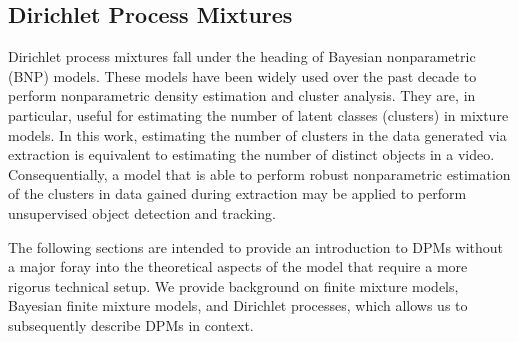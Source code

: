 \documentclass[smallcondensed, final]{svjour3}
\begin{document}






\subsection{Dirichlet Process Mixtures}
\label{sec:dpm}

Dirichlet process mixtures fall under the heading of Bayesian nonparametric (BNP) models. These models have been widely used over the past decade to perform nonparametric density estimation and cluster analysis. They are, in particular, useful for estimating the number of latent classes (clusters) in mixture models. In this work, estimating the number of clusters in the data generated via extraction is equivalent to estimating the number of distinct objects in a video. Consequentially, a model that is able to perform robust nonparametric estimation of the clusters in data gained during extraction may be applied to perform unsupervised object detection and tracking.

The following sections are intended to provide an introduction to DPMs without a major foray into the theoretical aspects of the model that require a more rigorus technical setup. We provide background on finite mixture models, Bayesian finite mixture models, and Dirichlet processes, which allows us to subsequently describe DPMs in context. 
\end{document}
